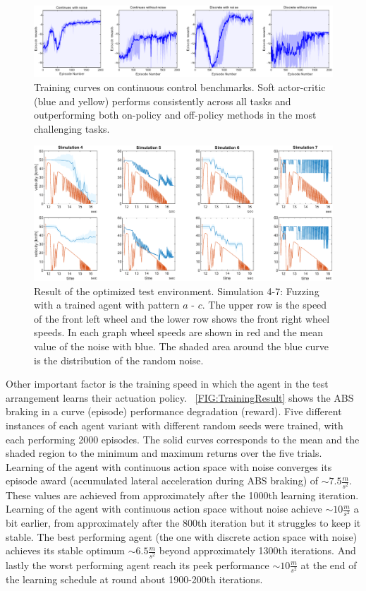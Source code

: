 \documentclass[a4paper, fleqn]{template/cas-dc}
\begin{document}
	\begin{figure}[hb]
		\centering
		\includegraphics[width=\textwidth]{figures/SAC_all_statistics.pdf}
		\caption{Training curves on continuous control benchmarks. Soft actor-critic (blue and yellow) performs
			consistently across all tasks and outperforming both on-policy and off-policy methods in the most challenging
			tasks.}
		\label{FIG:TrainingResult}
	\end{figure}		
	
	\begin{figure}[h]
		\centering
		\includegraphics[width=\textwidth]{figures/SAC_all_wheelspeeds.pdf}
		\caption{Result of the optimized test environment. Simulation 4-7: Fuzzing with a trained agent with pattern $a$ - $c$. The upper row is the speed of the front left wheel and the lower row shows the front right wheel speeds. In each graph wheel speeds are shown in red and the mean value of the noise with blue. The shaded area around the blue curve is the distribution of the random noise.}
		\label{FIG:TestResults}
	\end{figure}	
	
	Other important factor is the training speed in which the agent in the test arrangement learns their actuation policy. 
	~\autoref{FIG:TrainingResult} shows the ABS braking in a curve (episode) performance degradation (reward). Five different instances of each agent variant with different random seeds were trained, with each performing 2000 episodes. The solid curves corresponds to the mean and the shaded region to the minimum and maximum returns over the five trials.
	Learning of the agent with continuous action space with noise converges its episode award (accumulated lateral acceleration during ABS braking) of $\sim7.5 \frac{m}{s^2}$. These values are achieved from approximately after the 1000th learning iteration. Learning of the agent with continuous action space without noise achieve $\sim10 \frac{m}{s^2}$ a bit earlier, from approximately after the 800th iteration but it struggles to keep it stable. The best performing agent (the one with discrete action space with noise) achieves its stable optimum $\sim6.5 \frac{m}{s^2}$ beyond approximately 1300th iterations. And lastly the worst performing agent reach its peek performance $\sim10 \frac{m}{s^2}$ at the end of the learning schedule at round about 1900-200th iterations.
	
\end{document}

